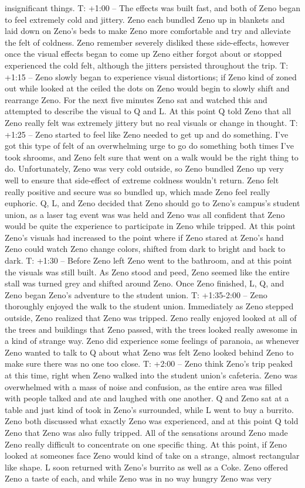\documentclass[12pt]{book}
\begin{document}
insignificant things. T: +1:00 -- The effects was built fast, and both of Zeno began to feel extremely cold and jittery. Zeno each bundled Zeno up in blankets and laid down on Zeno's beds to make Zeno more comfortable and try and alleviate the felt of coldness. Zeno remember severely disliked these side-effects, however once the visual effects began to come up Zeno either forgot about or stopped experienced the cold felt, although the jitters persisted throughout the trip. T: +1:15 -- Zeno slowly began to experience visual distortions; if Zeno kind of zoned out while looked at the ceiled the dots on Zeno would begin to slowly shift and rearrange Zeno. For the next five minutes Zeno sat and watched this and attempted to describe the visual to Q and L. At this point Q told Zeno that all Zeno really felt was extremely jittery but no real visuals or change in thought. T: +1:25 -- Zeno started to feel like Zeno needed to get up and do something. I've got this type of felt of an overwhelming urge to go do something both times I've took shrooms, and Zeno felt sure that went on a walk would be the right thing to do. Unfortunately, Zeno was very cold outside, so Zeno bundled Zeno up very well to ensure that side-effect of extreme coldness wouldn't return. Zeno felt really positive and secure was so bundled up, which made Zeno feel really euphoric. Q, L, and Zeno decided that Zeno should go to Zeno's campus's student union, as a laser tag event was was held and Zeno was all confident that Zeno would be quite the experience to participate in Zeno while tripped. At this point Zeno's visuals had increased to the point where if Zeno stared at Zeno's hand Zeno could watch Zeno change colors, shifted from dark to bright and back to dark. T: +1:30 -- Before Zeno left Zeno went to the bathroom, and at this point the visuals was still built. As Zeno stood and peed, Zeno seemed like the entire stall was turned grey and shifted around Zeno. Once Zeno finished, L, Q, and Zeno began Zeno's adventure to the student union. T: +1:35-2:00 -- Zeno thoroughly enjoyed the walk to the student union. Immediately as Zeno stepped outside, Zeno realized that Zeno was tripped. Zeno really enjoyed looked at all of the trees and buildings that Zeno passed, with the trees looked really awesome in a kind of strange way. Zeno did experience some feelings of paranoia, as whenever Zeno wanted to talk to Q about what Zeno was felt Zeno looked behind Zeno to make sure there was no one too close. T: +2:00 -- Zeno think Zeno's trip peaked at this time, right when Zeno walked into the student union's cafeteria. Zeno was overwhelmed with a mass of noise and confusion, as the entire area was filled with people talked and ate and laughed with one another. Q and Zeno sat at a table and just kind of took in Zeno's surrounded, while L went to buy a burrito. Zeno both discussed what exactly Zeno was experienced, and at this point Q told Zeno that Zeno was also fully tripped. All of the sensations around Zeno made Zeno really difficult to concentrate on one specific thing. At this point, if Zeno looked at someones face Zeno would kind of take on a strange, almost rectangular like shape. L soon returned with Zeno's burrito as well as a Coke. Zeno offered Zeno a taste of each, and while Zeno was in no way hungry Zeno was very 
\end{document}
